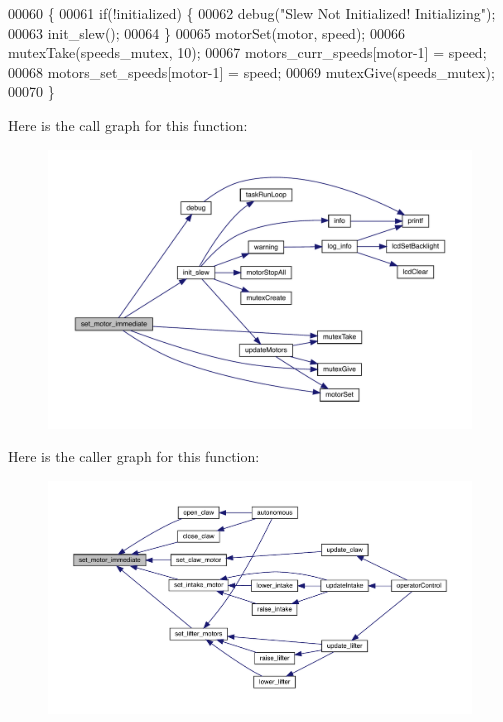 \begin{DoxyCode}
00060                                                \{
00061   \textcolor{keywordflow}{if}(!initialized) \{
00062     debug(\textcolor{stringliteral}{"Slew Not Initialized! Initializing"});
00063     init_slew();
00064   \}
00065   motorSet(motor, speed);
00066   mutexTake(speeds_mutex, 10);
00067   motors_curr_speeds[motor-1] = speed;
00068   motors_set_speeds[motor-1] = speed;
00069   mutexGive(speeds_mutex);
00070 \}
\end{DoxyCode}
Here is the call graph for this function\+:\nopagebreak
\begin{figure}[H]
\begin{center}
\leavevmode
\includegraphics[width=350pt]{slew_8h_a9f8b8ae577ef938622024545711f0151_cgraph}
\end{center}
\end{figure}
Here is the caller graph for this function\+:\nopagebreak
\begin{figure}[H]
\begin{center}
\leavevmode
\includegraphics[width=350pt]{slew_8h_a9f8b8ae577ef938622024545711f0151_icgraph}
\end{center}
\end{figure}
\mbox{\label{slew_8h_a7dff2b79dffe55fb936d977594d7c01d}} 
